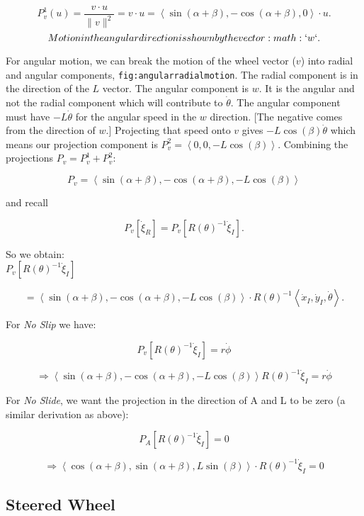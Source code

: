 \[P^1_v (u) = \frac{v\cdot u}{\| v\|^2} = v \cdot u = \left\langle \sin(\alpha+\beta) , -\cos(\alpha+\beta) , 0 \right\rangle \cdot u.\]\[Motion in the angular direction is shown by the vector :math:`w`.\]

For angular motion, we can break the motion of the wheel vector (\(v\))
into radial and angular components, \texttt{fig:angularradialmotion}.
The radial component is in the direction of the \(L\) vector. The
angular component is \(w\). It is the angular and not the radial
component which will contribute to \(\dot{\theta}\). The angular
component must have \(-L \dot{\theta}\) for the angular speed in the
\(w\) direction. {[}The negative comes from the direction of \(w\).{]}
Projecting that speed onto \(v\) gives \(-L\cos(\beta) \dot{\theta}\)
which means our projection component is
\(P^2_v = \left\langle 0 , 0 ,  -L\cos(\beta) \right\rangle\). Combining
the projections \(P_v = P^1_v + P^2_v\):

\[P_v =  \left\langle \sin(\alpha+\beta) , -\cos(\alpha+\beta), -L\cos(\beta) \right\rangle\]

and recall

\[P_v [\dot{\xi}_R]  = P_v [R(\theta)^{-1}\dot{\xi}_I] .\]

So we obtain:\\
\(P_v [R(\theta)^{-1}\dot{\xi}_I]\)

\[= \left\langle \sin(\alpha+\beta) , -\cos(\alpha+\beta), -L\cos(\beta) \right\rangle
\cdot R(\theta)^{-1}\left\langle \dot{x}_I , \dot{y}_I , \dot{\theta} \right\rangle .\]

For \emph{No Slip} we have:

\[P_v [R(\theta)^{-1}\dot{\xi}_I] =r\dot{\phi}\]

\[\Rightarrow  \left\langle \sin(\alpha+\beta) , -\cos(\alpha+\beta), -L\cos(\beta) \right\rangle
R(\theta)^{-1}\dot{\xi}_I = r\dot{\phi}\]

For \emph{No Slide}, we want the projection in the direction of A and L
to be zero (a similar derivation as above):

\[P_A [R(\theta)^{-1}\dot{\xi}_I]= 0\]

\[\Rightarrow  \left\langle \cos(\alpha+\beta) , \sin(\alpha+\beta), L\sin(\beta) \right\rangle
\cdot R(\theta)^{-1}\dot{\xi}_I= 0\]

\hypertarget{steered-wheel}{%
\subsection{Steered Wheel}\label{steered-wheel}}

